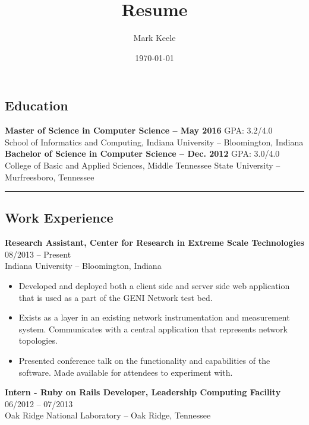 \documentclass[12pt,letterpaper]{article}
\author{Mark Keele}
\title{Resume}
\date{\today}
\begin{document}
\subsection*{Education}

\textbf{Master of Science in Computer Science -- May 2016}
\hfill{GPA: 3.2/4.0} \\
\bigskip School of Informatics and Computing, Indiana University -- Bloomington, Indiana \\
\noindent\textbf{Bachelor of Science in Computer Science -- Dec. 2012}
\hfill{GPA: 3.0/4.0}\\
College of Basic and Applied Sciences, Middle Tennessee State University -- Murfreesboro, Tennessee

\noindent\rule{7.5in}{0.4pt}

\subsection*{Work Experience}

\textbf{Research Assistant, Center for Research in Extreme Scale Technologies}
\hfill{08/2013 -- Present} \\
Indiana University -- Bloomington, Indiana

\begin{itemize}

  \item Developed and deployed both a client side and server side web
  application that is used as a part of the GENI Network test bed.

  \item Exists as a layer in an existing network instrumentation and
  measurement system. Communicates with a central application that represents
  network topologies.

  \item Presented conference talk on the functionality and capabilities of the software.
  Made available for attendees to experiment with.

\end{itemize}


\noindent\textbf{Intern - Ruby on Rails Developer, Leadership Computing Facility}
\hfill{06/2012 -- 07/2013} \\
Oak Ridge National Laboratory -- Oak Ridge, Tennessee
\end{document}
